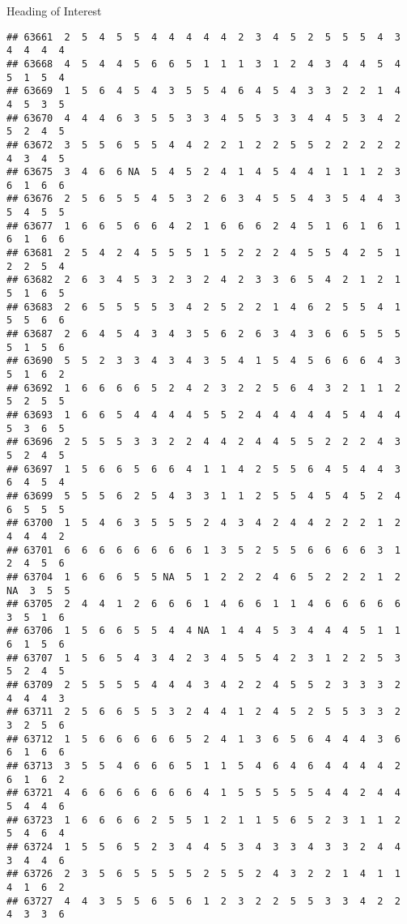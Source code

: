 \documentclass[
  ignorenonframetext,
]{beamer}
\begin{document}
\begin{frame}[fragile]{Heading of Interest}
\begin{verbatim}
## 63661  2  5  4  5  5  4  4  4  4  4  2  3  4  5  2  5  5  5  4  3  4  4  4  4
## 63668  4  5  4  4  5  6  6  5  1  1  1  3  1  2  4  3  4  4  5  4  5  1  5  4
## 63669  1  5  6  4  5  4  3  5  5  4  6  4  5  4  3  3  2  2  1  4  4  5  3  5
## 63670  4  4  4  6  3  5  5  3  3  4  5  5  3  3  4  4  5  3  4  2  5  2  4  5
## 63672  3  5  5  6  5  5  4  4  2  2  1  2  2  5  5  2  2  2  2  2  4  3  4  5
## 63675  3  4  6  6 NA  5  4  5  2  4  1  4  5  4  4  1  1  1  2  3  6  1  6  6
## 63676  2  5  6  5  5  4  5  3  2  6  3  4  5  5  4  3  5  4  4  3  5  4  5  5
## 63677  1  6  6  5  6  6  4  2  1  6  6  6  2  4  5  1  6  1  6  1  6  1  6  6
## 63681  2  5  4  2  4  5  5  5  1  5  2  2  2  4  5  5  4  2  5  1  2  2  5  4
## 63682  2  6  3  4  5  3  2  3  2  4  2  3  3  6  5  4  2  1  2  1  5  1  6  5
## 63683  2  6  5  5  5  5  3  4  2  5  2  2  1  4  6  2  5  5  4  1  5  5  6  6
## 63687  2  6  4  5  4  3  4  3  5  6  2  6  3  4  3  6  6  5  5  5  5  1  5  6
## 63690  5  5  2  3  3  4  3  4  3  5  4  1  5  4  5  6  6  6  4  3  5  1  6  2
## 63692  1  6  6  6  6  5  2  4  2  3  2  2  5  6  4  3  2  1  1  2  5  2  5  5
## 63693  1  6  6  5  4  4  4  4  5  5  2  4  4  4  4  4  5  4  4  4  5  3  6  5
## 63696  2  5  5  5  3  3  2  2  4  4  2  4  4  5  5  2  2  2  4  3  5  2  4  5
## 63697  1  5  6  6  5  6  6  4  1  1  4  2  5  5  6  4  5  4  4  3  6  4  5  4
## 63699  5  5  5  6  2  5  4  3  3  1  1  2  5  5  4  5  4  5  2  4  6  5  5  5
## 63700  1  5  4  6  3  5  5  5  2  4  3  4  2  4  4  2  2  2  1  2  4  4  4  2
## 63701  6  6  6  6  6  6  6  6  1  3  5  2  5  5  6  6  6  6  3  1  2  4  5  6
## 63704  1  6  6  6  5  5 NA  5  1  2  2  2  4  6  5  2  2  2  1  2 NA  3  5  5
## 63705  2  4  4  1  2  6  6  6  1  4  6  6  1  1  4  6  6  6  6  6  3  5  1  6
## 63706  1  5  6  6  5  5  4  4 NA  1  4  4  5  3  4  4  4  5  1  1  6  1  5  6
## 63707  1  5  6  5  4  3  4  2  3  4  5  5  4  2  3  1  2  2  5  3  5  2  4  5
## 63709  2  5  5  5  5  4  4  4  3  4  2  2  4  5  5  2  3  3  3  2  4  4  4  3
## 63711  2  5  6  6  5  5  3  2  4  4  1  2  4  5  2  5  5  3  3  2  3  2  5  6
## 63712  1  5  6  6  6  6  6  5  2  4  1  3  6  5  6  4  4  4  3  6  6  1  6  6
## 63713  3  5  5  4  6  6  6  5  1  1  5  4  6  4  6  4  4  4  4  2  6  1  6  2
## 63721  4  6  6  6  6  6  6  6  4  1  5  5  5  5  5  4  4  2  4  4  5  4  4  6
## 63723  1  6  6  6  6  2  5  5  1  2  1  1  5  6  5  2  3  1  1  2  5  4  6  4
## 63724  1  5  5  6  5  2  3  4  4  5  3  4  3  3  4  3  3  2  4  4  3  4  4  6
## 63726  2  3  5  6  5  5  5  5  2  5  5  2  4  3  2  2  1  4  1  1  4  1  6  2
## 63727  4  4  3  5  5  6  5  6  1  2  3  2  2  5  5  3  3  4  2  2  4  3  3  6

\end{verbatim}
\end{frame}
\end{document}
